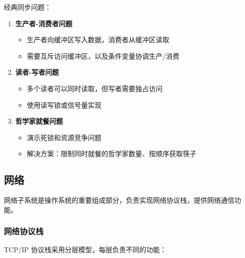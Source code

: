经典同步问题：

\begin{enumerate}
  \item \textbf{生产者-消费者问题}
    \begin{itemize}
      \item 生产者向缓冲区写入数据，消费者从缓冲区读取
      \item 需要互斥访问缓冲区，以及条件变量协调生产/消费
    \end{itemize}

  \item \textbf{读者-写者问题}
    \begin{itemize}
      \item 多个读者可以同时读取，但写者需要独占访问
      \item 使用读写锁或信号量实现
    \end{itemize}

  \item \textbf{哲学家就餐问题}
    \begin{itemize}
      \item 演示死锁和资源竞争问题
      \item 解决方案：限制同时就餐的哲学家数量、按顺序获取筷子
    \end{itemize}
\end{enumerate}

\subsection{网络}

网络子系统是操作系统的重要组成部分，负责实现网络协议栈，提供网络通信功能。

\subsubsection{网络协议栈}


TCP/IP 协议栈采用分层模型，每层负责不同的功能：

